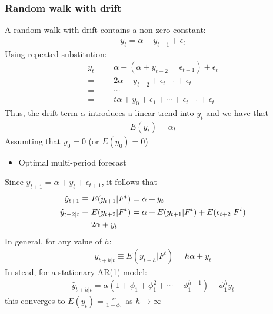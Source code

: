 \documentclass[a4paper,twoside,11pt]{article}
\begin{document}
\subsubsection{Random walk with drift}
A random walk with drift contains a non-zero constant:
\begin{equation*}
\begin{aligned}
y_t = \alpha + y_{t-1} + \epsilon_t
\end{aligned}
\end{equation*}
Using repeated substitution:
\begin{equation*}
\begin{aligned}
y_t =& \ \alpha + (\alpha + y_{t-2} = \epsilon_{t-1}) + \epsilon_t \\
=& \ 2 \alpha + y_{t-2} + \epsilon_{t-1} + \epsilon_t \\
=& \ \cdots \\
=& \ t \alpha + y_0 + \epsilon_1 + \cdots + \epsilon_{t-1} + \epsilon_t
\end{aligned}
\end{equation*}
Thus, the drift term $\alpha$ introduces a linear trend into $y_t$ and we have that
\begin{equation*}
\begin{aligned}
E(y_t) = \alpha_t
\end{aligned}
\end{equation*}
Assumting that $y_0 =0$ (or $E(y_0)=0$)
\newline
\newline
\begin{itemize}
    \item Optimal multi-period forecast
\end{itemize}
Since $y_{t+1} = \alpha + y_t + \epsilon_{t+1} $, it follows that 
\begin{equation*}
\begin{aligned}
\hat{y}_{t+1} \equiv& \ E(y_{t+1}|F^t) = \alpha + y_t \\
\newline
\hat{y}_{t+2|t} \equiv& \ E(y_{t+2}|F^t) = \alpha + E(y_{t+1} | F^t) + E(\epsilon_{t+2}|F^t) \\
=& \ 2\alpha + y_t
\end{aligned}
\end{equation*}
In general, for any value of $h$:
\begin{equation*}
\begin{aligned}
\hat{y}_{t+h|t} \equiv E(y_{t+h} |F^t) = h \alpha + y_t
\end{aligned}
\end{equation*}
In stead, for a stationary AR(1) model:
\begin{equation*}
\begin{aligned}
\hat{y}_{t+h|t} = \alpha(1+\phi_1 + \phi_1^2 + \cdots + \phi_1^{h-1}) + \phi_1^h y_t
\end{aligned}
\end{equation*}
this converges to $E(y_t) = \frac{\alpha}{1- \phi_1}$ as $h \rightarrow \infty$
\end{document}
